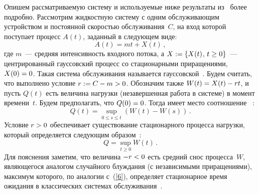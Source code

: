 \begin{multicols}{2}
Опишем рассматриваемую систему и используемые ниже результаты из~\cite{Lukashenko} 
более подробно.  Рассмотрим жидкостную систему с
одним обслуживающим устройством и постоянной скоростью обслуживания~$C$, 
на вход которой поступает процесс $A(t)$, заданный  в следующем виде:
\begin{equation}
A(t)=mt+X(t)\,, 
\label{asymp-l1}
\end{equation}
где  $m$~--- средняя интенсивность входного потока, а
$X:\hm=\{X(t)$, $t \hm\geq 0\}$~---  центрированный гауссовский процесс со
стационарными приращениями,  $X(0)\hm=0$. Такая система обслуживания
называется гауссовской~\cite{Mandjes}.  Будем считать, что выполнено
условие $r:=C\hm-m\hm>0$. Обозначим также $W(t)\hm=X(t)\hm-rt$, и пусть
 $Q(t)$  есть
величина нагрузки (незавершенная работа в системе) в момент времени~$t$. 
Будем предполагать, что  $Q(0)\hm=0$. Тогда имеет место соотношение~ \cite{Reich}:
\begin{equation}
Q(t)=\sup\limits_{0 \leq s \leq t}(W(t)-W(s))\,.\label{6a}
\end{equation}
Условие  $r\hm>0$ обеспечивает существование стационарного процесса
нагрузки,  который определяется следующим образом~\cite{Mandjes}:
\begin{equation}
Q= \sup\limits_{t \geq 0} W(t)\,.\label{6}
\end{equation}
 Для пояснения заметим, что величина $-r\hm<0$ есть средний снос
процесса~$W$, являющегося аналогом случайного блуждания (с
независимыми приращениями), максимум которого, по аналогии с~(\ref{6}), 
определяет стационарное время ожидания в классических системах обслуживания~\cite{Asmus}.


\end{multicols}

